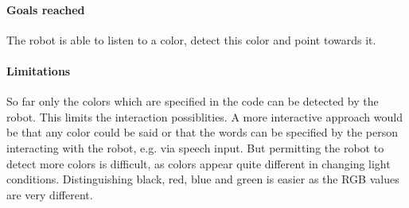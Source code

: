 \documentclass[a4paper]{article}
\begin{document}
\paragraph{Goals reached}
The robot is able to listen to a color, detect this color and point towards it.
\paragraph{Limitations}
So far only the colors which are specified in the code can be detected by the robot. This limits the interaction possiblities. A more interactive approach would be that any color could be said or that the words can be specified by the person interacting with the robot, e.g. via speech input.
But permitting the robot to detect more colors is difficult, as colors appear quite different in changing light conditions. Distinguishing black, red, blue and green is easier as the RGB values are very different.


\printbibliography
\end{document}

